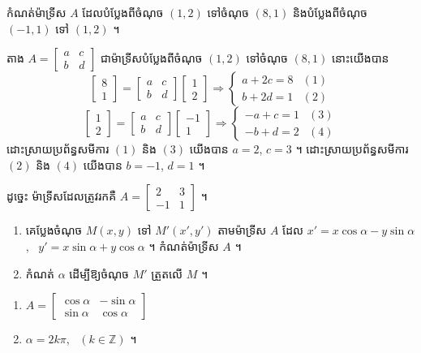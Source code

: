 \begin{example}[លំហាត់គំរូ ២]
កំណត់ម៉ាទ្រីស $A$ ដែលបំប្លែងពីចំណុច $(1, 2)$ ទៅចំណុច $(8, 1)$ និងបំប្លែងពីចំណុច $(-1, 1)$ ទៅ $(1, 2)$ ។
\end{example}
\ans
តាង $A = \begin{bmatrix} a & c\\ b & d \end{bmatrix}$ ជាម៉ាទ្រីសបំប្លែងពីចំណុច $(1, 2)$ ទៅចំណុច $(8, 1)$ នោះយើងបាន
\[ \begin{bmatrix} 8\\ 1 \end{bmatrix} = \begin{bmatrix} a & c\\ b & d \end{bmatrix}\begin{bmatrix} 1\\ 2 \end{bmatrix} \Rightarrow \begin{cases} a + 2c = 8 & (1)\\ b + 2d = 1 & (2) \end{cases} \]
\[ \begin{bmatrix} 1\\ 2 \end{bmatrix} = \begin{bmatrix} a & c\\ b & d \end{bmatrix}\begin{bmatrix} -1\\ 1 \end{bmatrix} \Rightarrow \begin{cases} -a + c = 1 & (3)\\ -b + d = 2 & (4) \end{cases} \]
ដោះស្រាយប្រព័ន្ធសមីការ $(1)$ និង $(3)$ យើងបាន $a = 2$, $c = 3$ ។ ដោះស្រាយប្រព័ន្ធសមីការ $(2)$ និង $(4)$ យើងបាន $b = -1$, $d = 1$ ។

ដូច្នេះ ម៉ាទ្រីសដែលត្រូវរកគឺ $A = \begin{bmatrix} 2 & 3\\ -1 & 1 \end{bmatrix}$ ។

\begin{pro}
\begin{enumerate}[1]
  \item គេប្លែងចំណុច $M(x, y)$ ទៅ $M'(x', y')$ តាមម៉ាទ្រីស $A$ ដែល $x' = x\cos\alpha - y\sin\alpha$, \ $y' = x\sin\alpha + y\cos\alpha$ ។ កំណត់ម៉ាទ្រីស $A$ ។
  \item កំណត់ $\alpha$ ដើម្បីឱ្យចំណុច $M'$ ត្រួតលើ $M$ ។
\end{enumerate}
\ans
\begin{enumerate}[1]
  \item $A = \begin{bmatrix} \cos\alpha & -\sin\alpha\\ \sin\alpha & \cos\alpha \end{bmatrix}$
  \item $\alpha = 2k\pi$, \ $(k \in \mathbb{Z})$ ។
\end{enumerate}
\end{pro}

